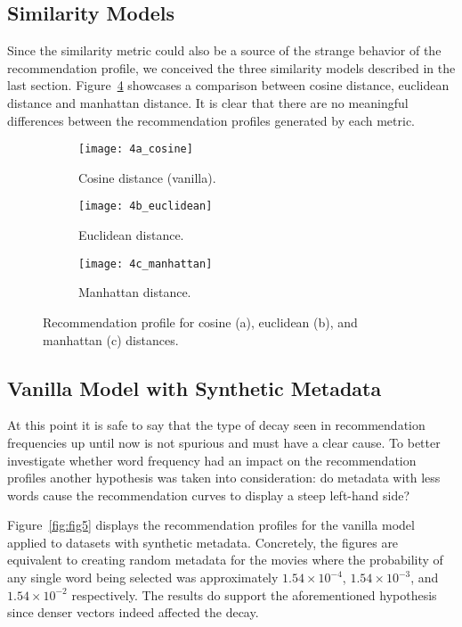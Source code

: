 \subsection{Similarity Models}
\label{subsec:similarity}

Since the similarity metric could also be a source of the strange behavior of
the recommendation profile, we conceived the three similarity models described
in the last section. Figure~\ref{fig:fig4} showcases a comparison between cosine
distance, euclidean distance and manhattan distance. It is clear that there are
no meaningful differences between the recommendation profiles generated by each
metric.

\begin{figure}
  \centering
  \begin{subfigure}{0.3\textwidth}
    \centering
    \texttt{[image: 4a\_cosine]}
    \caption{Cosine distance (vanilla).\label{fig:fig4a}}
  \end{subfigure}
  \begin{subfigure}{0.3\textwidth}
    \centering
    \texttt{[image: 4b\_euclidean]}
    \caption{Euclidean distance.\label{fig:fig4b}}
  \end{subfigure}
  \begin{subfigure}{0.3\textwidth}
    \centering
    \texttt{[image: 4c\_manhattan]}
    \caption{Manhattan distance.\label{fig:fig4c}}
  \end{subfigure}
  \caption{Recommendation profile for cosine (a), euclidean (b), and manhattan
    (c) distances.\label{fig:fig4}}
\end{figure}

\subsection{Vanilla Model with Synthetic Metadata}
\label{subsec:synthetic}

At this point it is safe to say that the type of decay seen in recommendation
frequencies up until now is not spurious and must have a clear cause. To better
investigate whether word frequency had an impact on the recommendation profiles
another hypothesis was taken into consideration: do metadata with less words
cause the recommendation curves to display a steep left-hand side?

Figure~\ref{fig:fig5} displays the recommendation profiles for the vanilla model
applied to datasets with synthetic metadata. Concretely, the figures are
equivalent to creating random metadata for the movies where the probability of
any single word being selected was approximately $1.54 \times 10^{-4}$, $1.54
\times 10^{-3}$, and $1.54 \times 10^{-2}$ respectively. The results do support
the aforementioned hypothesis since denser vectors indeed affected the decay.

